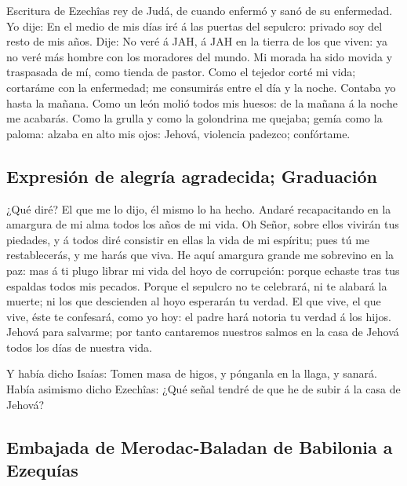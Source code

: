  Escritura de Ezechîas rey de Judá, de cuando enfermó y sanó
de su enfermedad.  Yo dije: En el medio de mis días iré á
las puertas del sepulcro: privado soy del resto de mis años.
 Dije: No veré á JAH, á JAH en la tierra de los que viven:
ya no veré más hombre con los moradores del mundo.  Mi
morada ha sido movida y traspasada de mí, como tienda de pastor. Como el
tejedor corté mi vida; cortaráme con la enfermedad; me consumirás entre
el día y la noche.  Contaba yo hasta la mañana. Como un
león molió todos mis huesos: de la mañana á la noche me acabarás.
 Como la grulla y como la golondrina me quejaba; gemía como
la paloma: alzaba en alto mis ojos: Jehová, violencia padezco;
confórtame.

\hypertarget{expresiuxf3n-de-alegruxeda-agradecida-graduaciuxf3n}{%
\subsection{Expresión de alegría agradecida;
Graduación}\label{expresiuxf3n-de-alegruxeda-agradecida-graduaciuxf3n}}

 ¿Qué diré? El que me lo dijo, él mismo lo ha hecho. Andaré
recapacitando en la amargura de mi alma todos los años de mi vida.
 Oh Señor, sobre ellos vivirán tus piedades, y á todos diré
consistir en ellas la vida de mi espíritu; pues tú me restablecerás, y
me harás que viva.  He aquí amargura grande me sobrevino en
la paz: mas á ti plugo librar mi vida del hoyo de corrupción: porque
echaste tras tus espaldas todos mis pecados.  Porque el
sepulcro no te celebrará, ni te alabará la muerte; ni los que descienden
al hoyo esperarán tu verdad.  El que vive, el que vive,
éste te confesará, como yo hoy: el padre hará notoria tu verdad á los
hijos.  Jehová para salvarme; por tanto cantaremos nuestros
salmos en la casa de Jehová todos los días de nuestra vida.

 Y había dicho Isaías: Tomen masa de higos, y pónganla en
la llaga, y sanará.  Había asimismo dicho Ezechîas: ¿Qué
señal tendré de que he de subir á la casa de Jehová?

\hypertarget{embajada-de-merodac-baladan-de-babilonia-a-ezequuxedas}{%
\subsection{Embajada de Merodac-Baladan de Babilonia a
Ezequías}\label{embajada-de-merodac-baladan-de-babilonia-a-ezequuxedas}}

